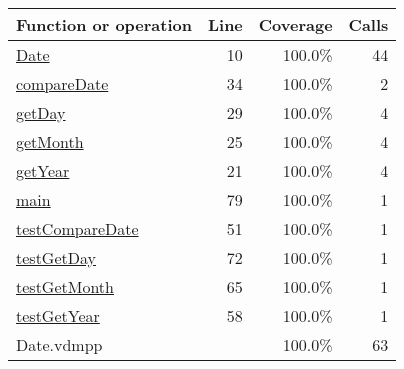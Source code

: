 \bigskip
\begin{longtable}{|l|r|r|r|}
\hline
Function or operation & Line & Coverage & Calls \\
\hline
\hline
\hyperref[Date:10]{Date} & 10&100.0\% & 44 \\
\hline
\hyperref[compareDate:34]{compareDate} & 34&100.0\% & 2 \\
\hline
\hyperref[getDay:29]{getDay} & 29&100.0\% & 4 \\
\hline
\hyperref[getMonth:25]{getMonth} & 25&100.0\% & 4 \\
\hline
\hyperref[getYear:21]{getYear} & 21&100.0\% & 4 \\
\hline
\hyperref[main:79]{main} & 79&100.0\% & 1 \\
\hline
\hyperref[testCompareDate:51]{testCompareDate} & 51&100.0\% & 1 \\
\hline
\hyperref[testGetDay:72]{testGetDay} & 72&100.0\% & 1 \\
\hline
\hyperref[testGetMonth:65]{testGetMonth} & 65&100.0\% & 1 \\
\hline
\hyperref[testGetYear:58]{testGetYear} & 58&100.0\% & 1 \\
\hline
\hline
Date.vdmpp & & 100.0\% & 63 \\
\hline
\end{longtable}

